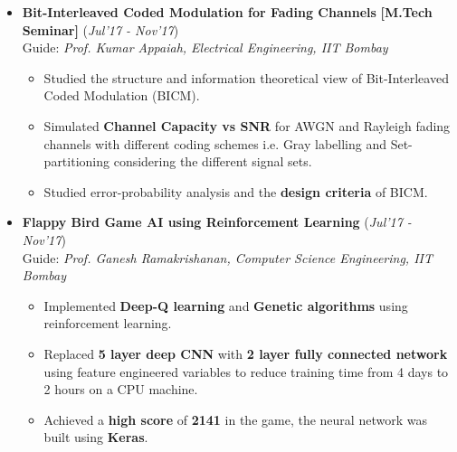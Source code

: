 \documentclass[10pt]{article}
\begin{document}
\begin{itemize}[leftmargin=0.4cm]
	\vspace{-0.2cm}	
	
\newpage	
\item \textbf{Bit-Interleaved Coded Modulation for Fading Channels
} \textbf{[M.Tech Seminar]}
\hfill{(\textit{Jul'17 - Nov'17})}\\
Guide: \textit{Prof. Kumar Appaiah, Electrical Engineering, IIT Bombay}\\\vspace{-0.68cm}
	\begin{itemize}
	\item Studied the structure and information theoretical view of Bit-Interleaved Coded Modulation (BICM).\vspace{-0.1cm}
	\item Simulated \textbf{Channel Capacity vs SNR} for AWGN and Rayleigh fading channels with different coding schemes i.e. Gray labelling and Set-partitioning considering the different signal sets.\vspace{-0.1cm}
	\item Studied error-probability analysis and the \textbf{design criteria} of BICM.

	\end{itemize}


	\vspace{-0.2cm}

\item \textbf{Flappy Bird Game AI using Reinforcement Learning}
\hfill{(\textit{Jul'17 - Nov'17})}\\
Guide: \textit{Prof. Ganesh Ramakrishanan, Computer Science Engineering, IIT Bombay}\\\vspace{-0.68cm}
	\begin{itemize}
	\item Implemented \textbf{Deep-Q learning} and \textbf{Genetic algorithms} using reinforcement learning.\vspace{-0.1cm}
	\item Replaced \textbf{5 layer deep CNN} with \textbf{2 layer fully connected network} using feature engineered variables to reduce training time from 4 days to 2 hours on a CPU machine.\vspace{-0.1cm}
	\item Achieved a \textbf{high score} of \textbf{2141} in the game, the neural network was built using \textbf{Keras}.
	\end{itemize}
	
	\vspace{-0.2cm}	
	


\end{itemize}
\end{document}
